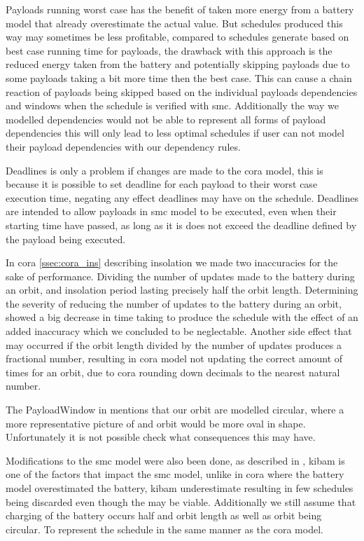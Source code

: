 Payloads running worst case has the benefit of taken more energy from a battery model that already overestimate the actual value. But schedules produced this way may sometimes be less profitable, compared to schedules generate based on best case running time for payloads, the drawback with this approach is the reduced energy taken from the battery and potentially skipping payloads due to some payloads taking a bit more time then the best case. This can cause a chain reaction of payloads being skipped based on the individual payloads dependencies and windows when the schedule is verified with \gls{smc}. Additionally the way we modelled dependencies would not be able to represent all forms of payload dependencies this will only lead to less optimal schedules if user can not model their payload dependencies with our dependency rules.

Deadlines is only a problem if changes are made to the \gls{cora} model, this is because it is possible to set deadline for each payload to their worst case execution time, negating any effect deadlines may have on the schedule. Deadlines are intended to allow payloads in \gls{smc} model to be executed, even when their starting time have passed, as long as it is does not exceed the deadline defined by the payload being executed.

In \gls{cora} \cref{ssec:cora_ins} describing insolation we made two inaccuracies for the sake of performance.  Dividing the number of updates made to the battery during an orbit, and insolation period lasting precisely half the orbit length. Determining the severity of reducing the number of updates to the battery during an orbit, showed a big decrease in time taking to produce the schedule with the effect of an added inaccuracy which we concluded to be neglectable. Another side effect that may occurred  if the orbit length divided by the number of updates produces a fractional number, resulting in \gls{cora} model not updating the correct amount of times for an orbit, due to \gls{cora} rounding down decimals to the nearest natural number.

The PayloadWindow in  mentions that our orbit are modelled circular, where a more representative picture of and orbit would be more oval in shape. Unfortunately it is not possible check what consequences this may have.

Modifications to the \gls{smc} model were also been done, as described in , \gls{kibam} is one of the factors that impact the \gls{smc} model, unlike in \gls{cora} where the battery model overestimated the battery, \gls{kibam} underestimate resulting in few schedules being discarded even though the may be viable. Additionally we still assume that charging of the battery occurs half and orbit length as well as orbit being circular. To represent the schedule in the same manner as the \gls{cora} model.


